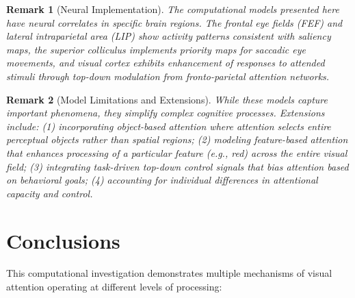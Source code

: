 \documentclass[a4paper, 11pt]{article}
\newtheorem{remark}{Remark}[section]
\begin{document}
\begin{remark}[Neural Implementation]
The computational models presented here have neural correlates in specific brain regions. The frontal eye fields (FEF) and lateral intraparietal area (LIP) show activity patterns consistent with saliency maps, the superior colliculus implements priority maps for saccadic eye movements, and visual cortex exhibits enhancement of responses to attended stimuli through top-down modulation from fronto-parietal attention networks.
\end{remark}

\begin{remark}[Model Limitations and Extensions]
While these models capture important phenomena, they simplify complex cognitive processes. Extensions include: (1) incorporating object-based attention where attention selects entire perceptual objects rather than spatial regions; (2) modeling feature-based attention that enhances processing of a particular feature (e.g., red) across the entire visual field; (3) integrating task-driven top-down control signals that bias attention based on behavioral goals; (4) accounting for individual differences in attentional capacity and control.
\end{remark}

\section{Conclusions}

This computational investigation demonstrates multiple mechanisms of visual attention operating at different levels of processing:
\end{document}
